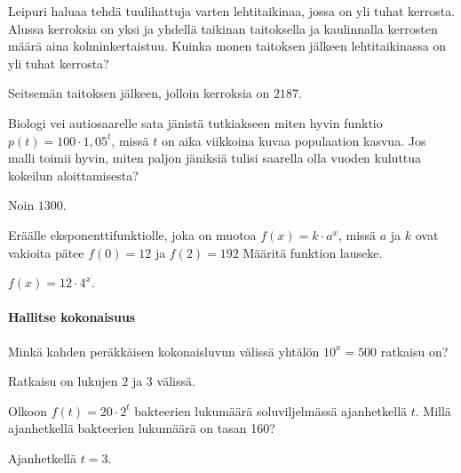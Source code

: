 \begin{tehtavasivu}
\begin{tehtava}
Leipuri haluaa tehdä tuulihattuja varten lehtitaikinaa, jossa on yli tuhat kerrosta. Alussa kerroksia on yksi ja yhdellä taikinan taitoksella ja kaulinnalla kerrosten määrä aina kolminkertaistuu. Kuinka monen taitoksen jälkeen lehtitaikinassa on yli tuhat kerrosta?
\begin{vastaus}
Seitsemän taitoksen jälkeen, jolloin kerroksia on $ 2187 $.
\end{vastaus}
\end{tehtava}

\begin{tehtava}
Biologi vei autiosaarelle sata jänistä tutkiakseen miten hyvin funktio $ p(t)=100 \cdot 1,05^{t}$, missä $ t $ on aika viikkoina kuvaa populaation kasvua. Jos malli toimii hyvin, miten paljon jäniksiä tulisi saarella olla vuoden kuluttua kokeilun aloittamisesta?
\begin{vastaus}
Noin $1300$.
\end{vastaus}
\end{tehtava}

\begin{tehtava}
Eräälle eksponenttifunktiolle, joka on muotoa $ f(x)=k\cdot a^{x}  $, missä $ a $ ja $ k $ ovat vakioita pätee $ f(0)=12 $ ja $ f(2)=192 $ Määritä funktion lauseke.
\begin{vastaus}
$f(x)=12\cdot 4^{x}$.
\end{vastaus}
\end{tehtava}


\paragraph*{Hallitse kokonaisuus}
\begin{tehtava}
Minkä kahden peräkkäisen kokonaisluvun välissä yhtälön
$10^x = 500$ ratkaisu on?
\begin{vastaus}
Ratkaisu on lukujen $2$ ja $3$ välissä.
\end{vastaus}
\end{tehtava}

\begin{tehtava}
Olkoon $f(t) = 20 \cdot 2^t$ bakteerien lukumäärä soluviljelmässä
ajanhetkellä $t$. Millä ajanhetkellä bakteerien lukumäärä on tasan 160?
\begin{vastaus}
Ajanhetkellä $t = 3$.
\end{vastaus}
\end{tehtava}


\end{tehtavasivu}

